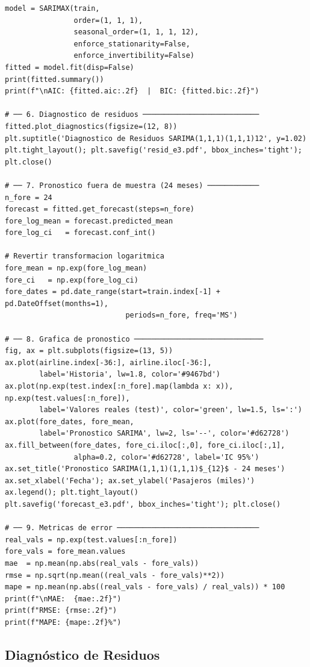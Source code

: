 \documentclass[12pt, a4paper]{article}
\begin{document}
\begin{lstlisting}[caption={Ejemplo 3: SARIMA(1,1,1)(1,1,1)$_{12}$},
                   label={lst:e3}]
model = SARIMAX(train,
                order=(1, 1, 1),
                seasonal_order=(1, 1, 1, 12),
                enforce_stationarity=False,
                enforce_invertibility=False)
fitted = model.fit(disp=False)
print(fitted.summary())
print(f"\nAIC: {fitted.aic:.2f}  |  BIC: {fitted.bic:.2f}")

# ── 6. Diagnostico de residuos ───────────────────────────
fitted.plot_diagnostics(figsize=(12, 8))
plt.suptitle('Diagnostico de Residuos SARIMA(1,1,1)(1,1,1)12', y=1.02)
plt.tight_layout(); plt.savefig('resid_e3.pdf', bbox_inches='tight'); plt.close()

# ── 7. Pronostico fuera de muestra (24 meses) ────────────
n_fore = 24
forecast = fitted.get_forecast(steps=n_fore)
fore_log_mean = forecast.predicted_mean
fore_log_ci   = forecast.conf_int()

# Revertir transformacion logaritmica
fore_mean = np.exp(fore_log_mean)
fore_ci   = np.exp(fore_log_ci)
fore_dates = pd.date_range(start=train.index[-1] + pd.DateOffset(months=1),
                            periods=n_fore, freq='MS')

# ── 8. Grafica de pronostico ──────────────────────────────
fig, ax = plt.subplots(figsize=(13, 5))
ax.plot(airline.index[-36:], airline.iloc[-36:],
        label='Historia', lw=1.8, color='#9467bd')
ax.plot(np.exp(test.index[:n_fore].map(lambda x: x)), np.exp(test.values[:n_fore]),
        label='Valores reales (test)', color='green', lw=1.5, ls=':')
ax.plot(fore_dates, fore_mean,
        label='Pronostico SARIMA', lw=2, ls='--', color='#d62728')
ax.fill_between(fore_dates, fore_ci.iloc[:,0], fore_ci.iloc[:,1],
                alpha=0.2, color='#d62728', label='IC 95%')
ax.set_title('Pronostico SARIMA(1,1,1)(1,1,1)$_{12}$ - 24 meses')
ax.set_xlabel('Fecha'); ax.set_ylabel('Pasajeros (miles)')
ax.legend(); plt.tight_layout()
plt.savefig('forecast_e3.pdf', bbox_inches='tight'); plt.close()

# ── 9. Metricas de error ─────────────────────────────────
real_vals = np.exp(test.values[:n_fore])
fore_vals = fore_mean.values
mae  = np.mean(np.abs(real_vals - fore_vals))
rmse = np.sqrt(np.mean((real_vals - fore_vals)**2))
mape = np.mean(np.abs((real_vals - fore_vals) / real_vals)) * 100
print(f"\nMAE:  {mae:.2f}")
print(f"RMSE: {rmse:.2f}")
print(f"MAPE: {mape:.2f}%")
\end{lstlisting}

\subsection{Diagnóstico de Residuos}
\end{document}
